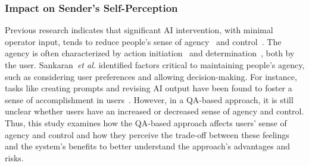 \subsubsection{Impact on Sender's Self-Perception}
Previous research indicates that significant AI intervention, with minimal operator input, tends to reduce people's sense of agency~\cite{Fu2023Comparing, mieczkowski2022examining} and control~\cite{Draxler2024The, Buschek2021The, kobiella2024if}. 
The agency is often characterized by action initiation~\cite{moore2012sense} and determination~\cite{bandura2001social}, both by the user. 
Sankaran~\textit{et al.}\cite{Sankaran2021Exploring} identified factors critical to maintaining people's agency, such as considering user preferences and allowing decision-making.
For instance, tasks like creating prompts and revising AI output have been found to foster a sense of accomplishment in users~\cite{kobiella2024if}.
However, in a QA-based approach, it is still unclear whether users have an increased or decreased sense of agency and control.
Thus, this study examines how the QA-based approach affects users’ sense of agency and control and how they perceive the trade-off between these feelings and the system’s benefits to better understand the approach’s advantages and risks.